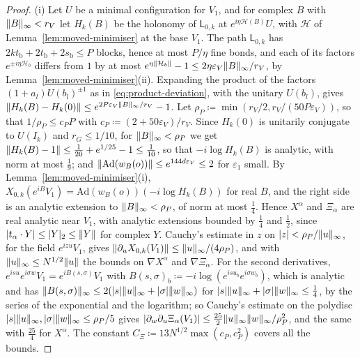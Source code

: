 \documentclass[11pt]{preprint}
\DeclarePairedDelimiter{\abs}{\lvert}{\rvert}
\DeclarePairedDelimiter{\norm}{\lVert}{\rVert}
\numberwithin{equation}{section}
\theoremstyle{definition}
\theoremstyle{remark}
\theoremstyle{plain}
\begin{document}
\begin{proof}
(i) Let $U$ be a minimal configuration for $V_1$, and for complex $B$ with $\norm B_\infty < r_V$ let $H_k(B)$ be the holonomy of $\mathsf L_{0,k}$ at $e^{i\eta\mathcal H(B)}U$, with $\mathcal H$ of Lemma~\ref{lem:moved-minimiser} at the base $V_1$. The path $\mathsf L_{0,k}$ has $2kt_{\mathrm b} + 2t_{\mathrm b} + 2s_{\mathrm b} \leq P$ blocks, hence at most $P/\eta$ fine bonds, and each of its factors $e^{\pm i\eta\mathcal H_b}$ differs from $1$ by at most $e^{\eta\norm{\mathcal H_b}} - 1 \leq 2\eta\varepsilon_V\norm B_\infty/r_V$, by Lemma~\ref{lem:moved-minimiser}(ii). Expanding the product of the factors $(1 + a_l)U(b_l)^{\pm1}$ as in \eqref{eq:product-deviation}, with the unitary $U(b_l)$, gives $\norm{H_k(B) - H_k(0)} \leq e^{2P\varepsilon_V\norm B_\infty/r_V} - 1$. Let $\rho_P \coloneqq \min(r_V/2, r_V/(50P\varepsilon_V))$, so that $1/\rho_P \leq c_PP$ with $c_P \coloneqq (2 + 50\varepsilon_V)/r_V$. Since $H_k(0)$ is unitarily conjugate to $U(I_k)$ and $r_G \leq 1/10$, for $\norm B_\infty < \rho_P$ we get $\norm{H_k(B) - 1} \leq \frac1{20} + e^{1/25} - 1 \leq \frac1{10}$, so that $-i\log H_k(B)$ is analytic, with norm at most $\frac19$; and $\norm{\mathrm{Ad}(w_B(o))} \leq e^{144d\varepsilon_V} \leq 2$ for $\varepsilon_1$ small. By Lemma~\ref{lem:moved-minimiser}(i), $X_{0,k}(e^{iB}V_1) = \mathrm{Ad}(w_B(o))(-i\log H_k(B))$ for real $B$, and the right side is an analytic extension to $\norm B_\infty < \rho_P$, of norm at most $\frac14$. Hence $X^\alpha$ and $\Xi_\alpha$ are real analytic near $V_1$, with analytic extensions bounded by $\frac14$ and $\frac12$, since $\abs{t_\alpha \cdot Y} \leq \abs Y_2 \leq \norm Y$ for complex $Y$. Cauchy's estimate in $z$ on $\abs z < \rho_P/\norm u_\infty$, for the field $e^{izu}V_1$, gives $\norm{\partial_uX_{0,k}(V_1)} \leq \norm u_\infty/(4\rho_P)$, and with $\norm u_\infty \leq N^{1/2}\norm u$ the bounds on $\nabla X^\alpha$ and $\nabla\Xi_\alpha$. For the second derivatives, $e^{isu}e^{i\sigma w}V_1 = e^{iB(s,\sigma)}V_1$ with $B(s, \sigma)_b \coloneqq -i\log(e^{isu_b}e^{i\sigma w_b})$, which is analytic and has $\norm{B(s, \sigma)}_\infty \leq 2(\abs s\norm u_\infty + \abs\sigma\norm w_\infty)$ for $\abs s\norm u_\infty + \abs\sigma\norm w_\infty \leq \frac14$, by the series of the exponential and the logarithm; so Cauchy's estimate on the polydisc $\abs s\norm u_\infty, \abs\sigma\norm w_\infty \leq \rho_P/5$ gives $\abs{\partial_w\partial_u\Xi_\alpha(V_1)} \leq \frac{25}2\norm u_\infty\norm w_\infty/\rho_P^2$, and the same with $\frac{25}4$ for $X^\alpha$. The constant $C_\Xi \coloneqq 13N^{1/2}\max(c_P, c_P^2)$ covers all the bounds.


\end{proof}
\end{document}
